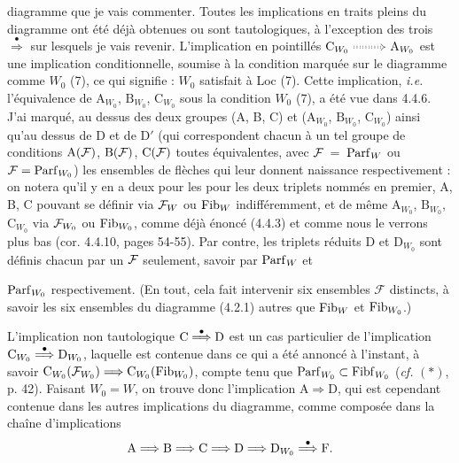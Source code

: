 diagramme que je vais commenter. Toutes les implications en traits pleins du diagramme ont été déjà obtenues ou sont tautologiques, à l'exception des trois $\overset{\bullet}{\Longrightarrow}$ sur lesquels je vais revenir. L'implication en pointillés $\mathrm{C}_{W_0} \dottedimplies \mathrm{A}_{W_0}$ est une implication conditionnelle, soumise à la condition marquée sur le diagramme comme $W_0$ (7), ce qui signifie : $W_0$ satisfait à Loc (7). Cette implication, \textit{i.e.} l'équivalence de $\mathrm{A}_{W_0}$, $\mathrm{B}_{W_0}$, $\mathrm{C}_{W_0}$ sous la condition $W_0$ (7), a été vue dans 4.4.6. J'ai marqué, au dessus des deux groupes (A, B, C) et ($\mathrm{A}_{W_0}$, $\mathrm{B}_{W_0}$, $\mathrm{C}_{W_0}$) ainsi qu'au dessus de D et de D$'$ (qui correspondent chacun à un tel groupe de conditions $\mathrm{A}(\mathcal{F})$, $\mathrm{B}(\mathcal{F})$, $\mathrm{C}(\mathcal{F})$ toutes équivalentes, avec $\mathcal{F} \;=\; \mathrm{Parf}_W$ ou $\mathcal{F} = \mathrm{Parf}_{W_0}$) les
ensembles de flèches qui leur donnent naissance respectivement : on notera qu'il y en a deux pour les pour les deux triplets nommés en premier, A, B, C pouvant se définir via $\mathcal{F}_W$ ou $\mathrm{Fib}_W$ indifféremment, et de même $\mathrm{A}_{W_0}$, $\mathrm{B}_{W_0}$, $\mathrm{C}_{W_0}$ via $\mathcal{F}_{W_0}$ ou $\mathrm{Fib}_{W_0}$, comme déjà énoncé (4.4.3) et comme nous le verrons plus bas (cor. 4.4.10, pages 54-55). Par contre, les triplets réduits D et $\mathrm{D}_{W_0}$ sont définis chacun par un $\mathcal{F}$ seulement, savoir par $\mathrm{Parf}_W$ et %

\setcounter{footnote}{30}

$\mathrm{Parf}_{W_0}$ respectivement. (En tout, cela fait intervenir six ensembles $\mathcal{F}$ distincts, à savoir les six ensembles du diagramme (4.2.1) autres que $\mathrm{Fib}_W$ et $\mathrm{Fib}_{W_0}$.)

L'implication non tautologique $\mathrm{C} \overset{\bullet}{\Longrightarrow} \mathrm{D}$ est un cas particulier de l'implication $\mathrm{C}_{W_0} \overset{\bullet}{\Longrightarrow} \mathrm{D}_{W_0}$, laquelle est contenue dans ce qui a été annoncé à l'instant, à savoir $\mathrm{C}_{W_0}(\mathcal{F}_{W_0}) \Longrightarrow \mathrm{C}_{W_0}(\mathrm{Fib}_{W_0})$, compte tenu que $\mathrm{Parf}_{W_0} \subset \mathrm{Fibf}_{W_0}$ (\textit{cf.} $(*)$, p. 42). Faisant
$W_0 = W$, on trouve donc l'implication $\mathrm{A} \Longrightarrow \mathrm{D}$, qui est cependant contenue dans les autres implications du diagramme, comme composée dans la chaîne d'implications
\[
\mathrm{A} \Longrightarrow \mathrm{B} \Longrightarrow \mathrm{C} \Longrightarrow \mathrm{D} \Longrightarrow \mathrm{D}_{W_0} \overset{\bullet}{\Longrightarrow} \mathrm{F}.
\]

